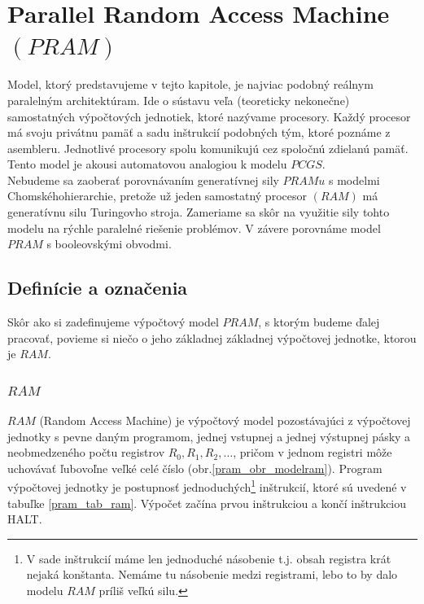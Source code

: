 \chapter{Parallel Random Access Machine $(PRAM)$}

Model, ktorý predstavujeme v tejto kapitole, je najviac podobný
reálnym paralelným architektúram. Ide o sústavu veľa (teoreticky
nekonečne) samostatných výpočtových jednotiek, ktoré nazývame
procesory. Každý procesor má svoju privátnu pamäť a sadu
inštrukcií podobných tým, ktoré poznáme z asembleru. Jednotlivé
procesory spolu komunikujú cez spoločnú zdielanú pamäť. Tento
model je akousi automatovou analogiou k modelu $PCGS$.
\\ Nebudeme sa zaoberať porovnávaním generatívnej sily $PRAMu$ s
modelmi Chomského\newline hierarchie, pretože už jeden samostatný
procesor $(RAM)$ má generatívnu silu Turingovho stroja. Zameriame
sa skôr na využitie sily tohto modelu na rýchle paralelné riešenie
problémov. V závere porovnáme model $PRAM$ s booleovskými obvodmi.

\section{Definície a označenia}

Skôr ako si zadefinujeme výpočtový model $PRAM$, s ktorým budeme
ďalej pracovať, povieme si niečo o jeho základnej základnej
výpočtovej jednotke, ktorou je $RAM$.

\subsection{$RAM$}

\begin{definicia}
  $RAM$ (Random Access Machine) je výpočtový model pozostávajúci z
  výpočtovej jednotky s pevne daným programom, jednej vstupnej a
  jednej výstupnej pásky a neobmedzeného počtu registrov
  $R_0,R_1,R_2,\dots$, pričom v jednom registri môže uchovávať
  ľubovoľne veľké celé číslo (obr.\ref{pram_obr_modelram}). Program
  výpočtovej jednotky je postupnosť jednoduchých\footnote{V sade
  inštrukcií máme len jednoduché násobenie t.j. obsah registra krát
  nejaká konštanta. Nemáme tu násobenie medzi registrami, lebo to by
  dalo modelu $RAM$ príliš veľkú silu.} inštrukcií, ktoré sú uvedené
  v tabuľke \ref{pram_tab_ram}. Výpočet začína prvou inštrukciou a
  končí inštrukciou HALT.
\end{definicia}

